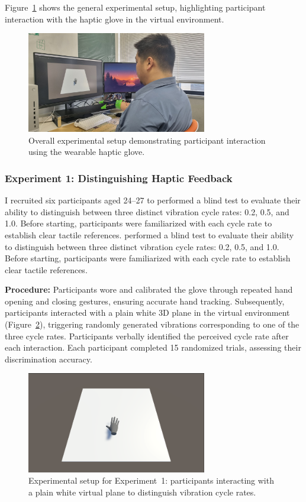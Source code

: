 \documentclass[graybox]{svmult}
\begin{document}
Figure~\ref{fig:experiment_setup} shows the general experimental setup, highlighting participant interaction with the haptic glove in the virtual environment.

\begin{figure}\centering
	\includegraphics[width=0.7\textwidth]{figure/experiment.png}%
	\caption{Overall experimental setup demonstrating participant interaction using the wearable haptic glove.}\label{fig:experiment_setup}
\end{figure}

\subsubsection{Experiment 1: Distinguishing Haptic Feedback}
I recruited six participants aged 24–27 to performed a blind test to evaluate their ability to distinguish between three distinct vibration cycle rates: 0.2, 0.5, and 1.0. Before starting, participants were familiarized with each cycle rate to establish clear tactile references.
performed a blind test to evaluate their ability to distinguish between three distinct vibration cycle rates: 0.2, 0.5, and 1.0. Before starting, participants were familiarized with each cycle rate to establish clear tactile references.

\textbf{Procedure:} Participants wore and calibrated the glove through repeated hand opening and closing gestures, ensuring accurate hand tracking. Subsequently, participants interacted with a plain white 3D plane in the virtual environment (Figure~\ref{fig:experiment1_setup}), triggering randomly generated vibrations corresponding to one of the three cycle rates. Participants verbally identified the perceived cycle rate after each interaction. Each participant completed 15 randomized trials, assessing their discrimination accuracy.

\begin{figure}[H]
	\centering
	\includegraphics[width=0.7\textwidth]{figure/ex1.png}%
	\caption{Experimental setup for Experiment~1: participants interacting with a plain white virtual plane to distinguish vibration cycle rates.}\label{fig:experiment1_setup}
\end{figure}
\end{document}
